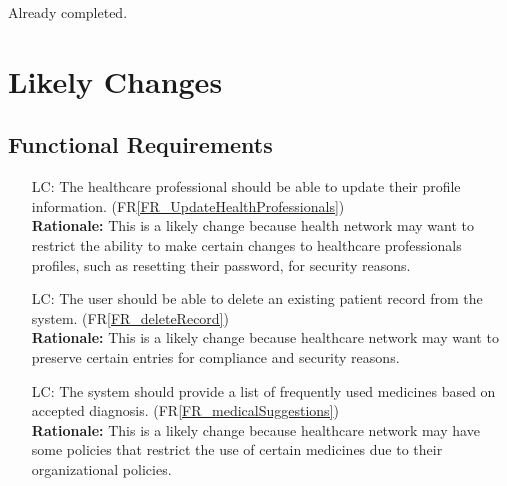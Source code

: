 \documentclass[12pt]{article}
\newcounter{lcnum} %
\begin{document}
Already completed.

\section{Likely Changes}

\subsection{Functional Requirements}
\noindent \begin{itemize}
\item[LC\refstepcounter{lcnum}\thelcnum\label{LC_profileUpdate}:] The healthcare professional should be able to update their profile information. (FR\ref{FR_UpdateHealthProfessionals})\\
\textbf{Rationale:} This is a likely change because health network may want to restrict the ability to make certain changes to healthcare professionals profiles, such as resetting their password, for security reasons.

\item[LC\refstepcounter{lcnum}\thelcnum\label{LC_patientDelete}:] The user should be able to delete an existing patient record from the system. (FR\ref{FR_deleteRecord})\\
\textbf{Rationale:} This is a likely change because healthcare network may want to preserve certain entries for compliance and security reasons.

\item[LC\refstepcounter{lcnum}\thelcnum\label{LC_addHealthNetwork}:] The system should provide a list of frequently used medicines based on accepted diagnosis. (FR\ref{FR_medicalSuggestions})\\
\textbf{Rationale:} This is a likely change because healthcare network may have some policies that restrict the use of certain medicines due to their organizational policies.
\end{itemize}
\end{document}
